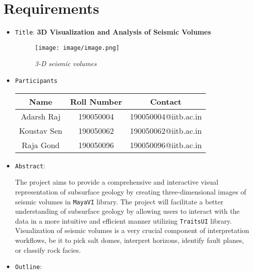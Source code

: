 \documentclass[11pt,a4paper]{article}
\begin{document}
\section*{{\LARGE Requirements}}
\begin{itemize}
    \item \texttt{Title}: \textcolor{codegreen}{\bf 3D Visualization and Analysis of Seismic Volumes}
    \begin{figure}[H]
        \centering
        \texttt{[image: image/image.png]}
        \caption{\textit{3-D seismic volumes}}
        \label{fig:pt1}
    \end{figure}
    \item \texttt{Participants}
    \begin{center}
         \begin{tabular}{||c | c | c||} 
         \hline
         \textbf{Name} & \textbf{Roll Number} & \textbf{Contact} \\ [0.5ex] 
         \hline \hline 
         Adarsh Raj & 190050004 & 190050004@iitb.ac.in \\ 
         \hline 
         Koustav Sen & 190050062 & 190050062@iitb.ac.in \\
         \hline 
         Raja Gond & 190050096 & 190050096@iitb.ac.in \\
         \hline
        \end{tabular}
    \end{center}
    \item \texttt{Abstract}:
    
    The project aims to provide a comprehensive and interactive visual representation of subsurface geology by creating three-dimensional images of seismic volumes in \verb!MayaVI! library. The project will facilitate a better understanding of subsurface geology by allowing users to interact with the data in a more intuitive and efficient manner utilizing \verb!TraitsUI! library. Visualization of seismic volumes  is a very crucial component of interpretation workflows, be it to pick salt domes, interpret horizons, identify fault planes, or classify rock facies. 
    
    \item \texttt{Outline}:
    

\end{itemize}
\end{document}
